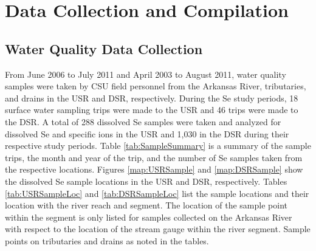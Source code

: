 \chapter{Data Collection and Compilation}
\label{chap:data collection}

\section{Water Quality Data Collection}
\label{sec:field data collection}

From June 2006 to July 2011 and April 2003 to August 2011, water quality samples were taken by CSU field personnel from the Arkansas River, tributaries, and drains in the USR and DSR, respectively.   During the Se study periods, 18 surface water sampling trips were made to the USR and 46 trips were made to the DSR.  A total of 288 dissolved Se samples were taken and analyzed for dissolved Se and specific ions in the USR and 1,030 in the DSR during their respective study periods.  Table \ref{tab:SampleSummary} is a summary of the sample trips, the month and year of the trip, and the number of Se samples taken from the respective locations.  Figures \ref{map:USRSample} and \ref{map:DSRSample} show the dissolved Se sample locations in the USR and DSR, respectively.  Tables \ref{tab:USRSampleLoc} and \ref{tab:DSRSampleLoc} list the sample locations and their location with the river reach and segment.  The location of the sample point within the segment is only listed for samples collected on the Arkansas River with respect to the location of the stream gauge within the river segment.  Sample points on tributaries and drains as noted in the tables.

